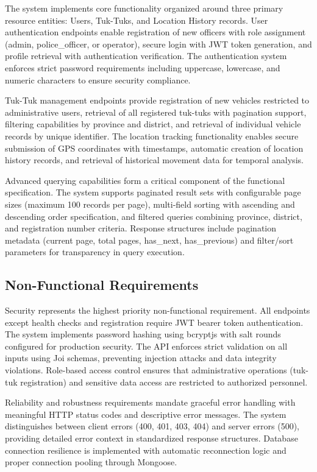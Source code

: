 \documentclass[12pt,a4paper]{article}
\begin{document}
The system implements core functionality organized around three primary resource entities: Users, Tuk-Tuks, and Location History records. User authentication endpoints enable registration of new officers with role assignment (admin, police\_officer, or operator), secure login with JWT token generation, and profile retrieval with authentication verification. The authentication system enforces strict password requirements including uppercase, lowercase, and numeric characters to ensure security compliance.

Tuk-Tuk management endpoints provide registration of new vehicles restricted to administrative users, retrieval of all registered tuk-tuks with pagination support, filtering capabilities by province and district, and retrieval of individual vehicle records by unique identifier. The location tracking functionality enables secure submission of GPS coordinates with timestamps, automatic creation of location history records, and retrieval of historical movement data for temporal analysis.

Advanced querying capabilities form a critical component of the functional specification. The system supports paginated result sets with configurable page sizes (maximum 100 records per page), multi-field sorting with ascending and descending order specification, and filtered queries combining province, district, and registration number criteria. Response structures include pagination metadata (current page, total pages, has\_next, has\_previous) and filter/sort parameters for transparency in query execution.

\subsection{Non-Functional Requirements}

Security represents the highest priority non-functional requirement. All endpoints except health checks and registration require JWT bearer token authentication. The system implements password hashing using bcryptjs with salt rounds configured for production security. The API enforces strict validation on all inputs using Joi schemas, preventing injection attacks and data integrity violations. Role-based access control ensures that administrative operations (tuk-tuk registration) and sensitive data access are restricted to authorized personnel.

Reliability and robustness requirements mandate graceful error handling with meaningful HTTP status codes and descriptive error messages. The system distinguishes between client errors (400, 401, 403, 404) and server errors (500), providing detailed error context in standardized response structures. Database connection resilience is implemented with automatic reconnection logic and proper connection pooling through Mongoose.
\end{document}
